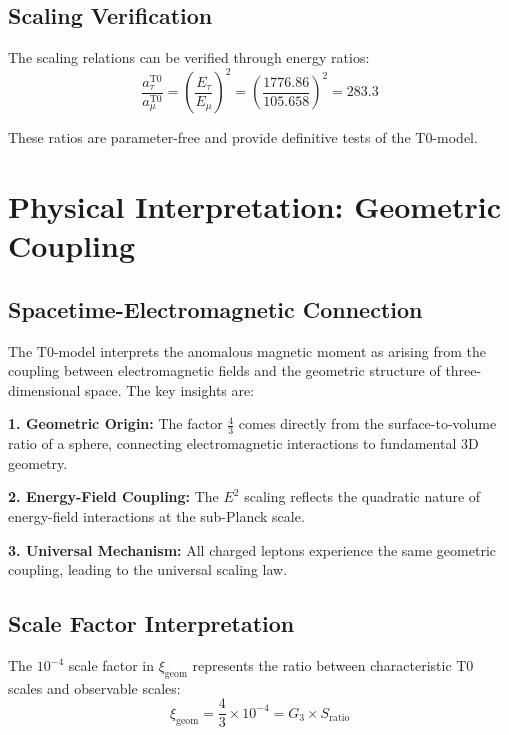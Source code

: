 \documentclass[12pt,a4paper]{report}
\newcommand{\xigeom}{\xi_{\text{geom}}}   %
\newcommand{\Emu}{E_\mu}                  %
\newcommand{\Etau}{E_\tau}                %
\begin{document}
	\subsection{Scaling Verification}
	\label{subsec:scaling_verification}
	
	The scaling relations can be verified through energy ratios:
	\begin{equation}
		\frac{a_\tau^{\text{T0}}}{a_\mu^{\text{T0}}} = \left(\frac{\Etau}{\Emu}\right)^2 = \left(\frac{1776.86}{105.658}\right)^2 = 283.3
		\label{eq:tau_muon_ratio}
	\end{equation}
	
	These ratios are parameter-free and provide definitive tests of the T0-model.
	
	\section{Physical Interpretation: Geometric Coupling}
	\label{sec:physical_interpretation}
	
	\subsection{Spacetime-Electromagnetic Connection}
	\label{subsec:spacetime_electromagnetic}
	
	The T0-model interprets the anomalous magnetic moment as arising from the coupling between electromagnetic fields and the geometric structure of three-dimensional space. The key insights are:
	
	\textbf{1. Geometric Origin:}
	The factor $\frac{4}{3}$ comes directly from the surface-to-volume ratio of a sphere, connecting electromagnetic interactions to fundamental 3D geometry.
	
	\textbf{2. Energy-Field Coupling:}
	The $E^2$ scaling reflects the quadratic nature of energy-field interactions at the sub-Planck scale.
	
	\textbf{3. Universal Mechanism:}
	All charged leptons experience the same geometric coupling, leading to the universal scaling law.
	
	\subsection{Scale Factor Interpretation}
	\label{subsec:scale_factor}
	
	The $10^{-4}$ scale factor in $\xigeom$ represents the ratio between characteristic T0 scales and observable scales:
	\begin{equation}
		\xigeom = \frac{4}{3} \times 10^{-4} = G_3 \times S_{\text{ratio}}
		\label{eq:scale_interpretation}
	\end{equation}
	
\end{document}
